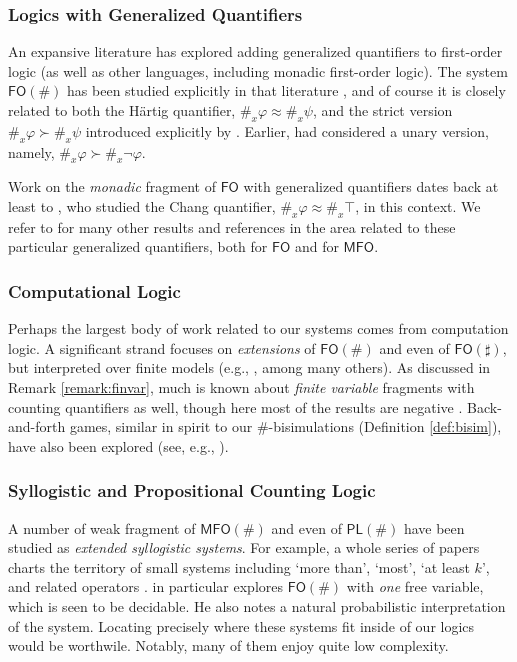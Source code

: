 \documentclass[12pt,oneside,reqno]{amsart}
\theoremstyle{definition}
\begin{document}
\subsubsection*{Logics with Generalized Quantifiers} An expansive literature has explored adding generalized quantifiers to first-order logic (as well as other languages, including monadic first-order logic). The system $\mathsf{FO}(\#)$ has been studied explicitly in that literature \citep{hartig,antonelli2010,PetersWesterstahl}, and of course it is closely related to both the H\"{a}rtig quantifier, $\#_x\varphi \approx \#_x\psi$, and the strict version $\#_x\varphi \succ \#_x \psi$ introduced explicitly by \cite{Lindstrom}. 
Earlier, \cite{rescher} had considered a unary version, namely, 
$\#_x\varphi \succ \#_x\neg \varphi$. 

Work on the \emph{monadic} fragment of $\mathsf{FO}$ with generalized quantifiers dates back at least to \cite{Slomson}, who studied the Chang quantifier, $\#_x\varphi \approx \#_x\top$, in this context. We refer to \cite{PetersWesterstahl} for many other results and references in the area related to these particular generalized quantifiers, both for $\mathsf{FO}$ and for $\mathsf{MFO}$. 


\subsubsection*{Computational Logic} Perhaps the largest body of work related to our systems comes from computation logic. A significant strand focuses on \emph{extensions} of $\mathsf{FO}(\#)$ and even of $\mathsf{FO}(\sharp)$, but interpreted over finite models (e.g., \citealt{Immerman1992,Grumbach,Schweikardt,Kuske}, among many others).  As discussed in Remark \ref{remark:finvar}, much is known about \emph{finite variable} fragments with counting quantifiers as well, though here most of the results are negative \citep{Otto,Gradel1999,Kieronski}. Back-and-forth games, similar in spirit to our $\#$-bisimulations (Definition \ref{def:bisim}), have also been explored (see, e.g., \citealt{Immerman1992,Otto}).

\subsubsection*{Syllogistic and Propositional Counting Logic} A number of weak fragment of $\mathsf{MFO}(\#)$ and even of $\mathsf{PL}(\#)$ have been studied as \emph{extended syllogistic systems}. For example, a whole series of papers charts the territory of small systems including `more than', `most', `at least $k$', and related operators \citep{Hartmann2008,Hartmann2009,Moss2016,LaiEndrullisMoss,EndrullisMoss,moss_topal_2020,KisbyMoss}. \cite{Hartmann2008} in particular explores $\mathsf{FO}(\#)$ with \emph{one} free variable, which is seen to be decidable. He also notes a natural probabilistic interpretation of the system. Locating precisely where these systems fit inside of our logics would be worthwile. Notably, many of them enjoy quite low complexity. 
\end{document}
